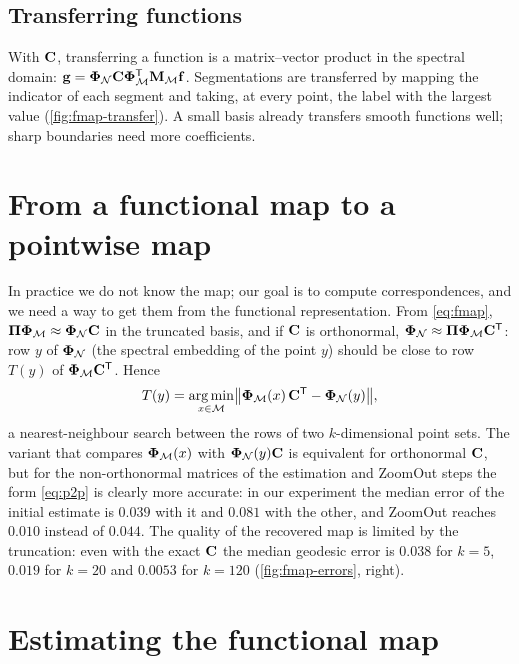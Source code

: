 \subsection{Transferring functions}

With $\mathbf{C}$, transferring a function is a matrix--vector product in the spectral domain:
$\mathbf{g}=\boldsymbol{\Phi}_{\mathcal{N}}\mathbf{C}\boldsymbol{\Phi}_{\mathcal{M}}^{\mathsf{T}}\mathbf{M}_{\mathcal{M}}\mathbf{f}$. Segmentations are transferred by mapping the indicator of each
segment and taking, at every point, the label with the largest value (\cref{fig:fmap-transfer}). A small
basis already transfers smooth functions well; sharp boundaries need more coefficients.


\section{From a functional map to a pointwise map}

In practice we do not know the map; our goal is to compute correspondences, and we need a way to get
them from the functional representation. From \eqref{eq:fmap}, $\boldsymbol{\Pi}\boldsymbol{\Phi}_{\mathcal{M}}\approx\boldsymbol{\Phi}_{\mathcal{N}}\mathbf{C}$ in the
truncated basis, and if $\mathbf{C}$ is orthonormal, $\boldsymbol{\Phi}_{\mathcal{N}}\approx\boldsymbol{\Pi}\boldsymbol{\Phi}_{\mathcal{M}}\mathbf{C}^{\mathsf{T}}$: row $y$ of
$\boldsymbol{\Phi}_{\mathcal{N}}$ (the spectral embedding of the point $y$) should be close to row $T(y)$ of $\boldsymbol{\Phi}_{\mathcal{M}}\mathbf{C}^{\mathsf{T}}$.
Hence
\begin{equation}
T(y)=\operatorname*{arg\,min}_{x\in\mathcal{M}}\bigl\|\boldsymbol{\Phi}_{\mathcal{M}}(x)\,\mathbf{C}^{\mathsf{T}}-\boldsymbol{\Phi}_{\mathcal{N}}(y)\bigr\| ,
\label{eq:p2p}
\end{equation}
a nearest-neighbour search between the rows of two $k$-dimensional point sets. The variant that
compares $\boldsymbol{\Phi}_{\mathcal{M}}(x)$ with $\boldsymbol{\Phi}_{\mathcal{N}}(y)\mathbf{C}$ is equivalent for orthonormal $\mathbf{C}$, but for the
non-orthonormal matrices of the estimation and ZoomOut steps the form \eqref{eq:p2p} is clearly more
accurate: in our experiment the median error of the initial estimate is $0.039$ with it and $0.081$ with
the other, and ZoomOut reaches $0.010$ instead of $0.044$. The quality of the recovered map is limited by
the truncation: even with the exact $\mathbf{C}$ the median geodesic error is $0.038$ for $k=5$, $0.019$ for
$k=20$ and $0.0053$ for $k=120$ (\cref{fig:fmap-errors}, right).

\section{Estimating the functional map}

